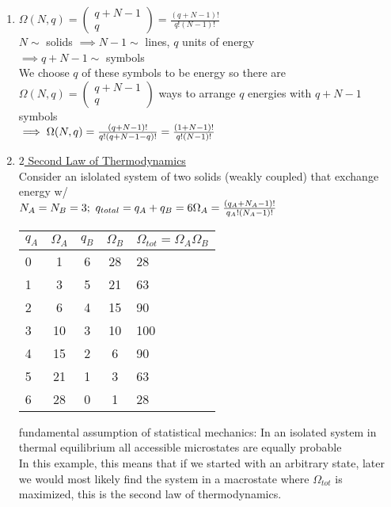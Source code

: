 \documentclass[12pt]{amsart}
\begin{document}
\begin{enumerate}
\item \underline{$\Omega(N,q) = \begin{pmatrix} q + N-1 \\ q \end{pmatrix} = \frac{( q+N-1)!}{q! (N-1) !}$}\\
$N \sim$ solids $\implies N-1 \sim$ lines, $q$ units of energy\\
$\implies q+ N -1 \sim$ symbols\\
We choose $q$ of these symbols to be energy so there are $\Omega(N, q) = \begin{pmatrix} q + N -1 \\ q \end{pmatrix}$ ways to arrange $q$ energies with $q + N-1$ symbols\\
$\implies \Omega(N,q) = \frac{(q + N -1)!}{q! (q+ N-1-q)!} = \frac{(1 + N -1 )!}{q! (N-1)!}\\$


\hdashrule[0.5ex][c]{\linewidth}{0.5pt}{1.5mm}


\item \underline{$2$ Second Law of Thermodynamics}\\
Consider an islolated system of two solids (weakly coupled) that exchange energy w/ \\
$N_A = N_B = 3;\,\, q_{total} = q_A + q_B = 6\\
\Omega_A = \frac{(q_A + N_A -1)!}{q_A! (N_A -1)!}\\$

\begin{table}[h!]
  \begin{center}
    \label{tab:table1}
    \begin{tabular}{l|c|c|c|l} %
      \textbf{$q_A$} & \textbf{$\Omega_A$} & \textbf{$q_B$} & \textbf{$\Omega_B$} & \textbf{$\Omega_{tot} = \Omega_A \Omega_B$}\\
      \hline
      0 & 1 & 6 & 28 & 28\\
      1 & 3 & 5 & 21 & 63\\
      2 & 6 & 4 & 15 & 90\\
      3 & 10 & 3 & 10 & 100\\
      4 & 15 & 2 & 6 & 90\\
      5 & 21 & 1 & 3 & 63\\
      6 & 28 & 0 & 1 & 28
    \end{tabular}
  \end{center}
\end{table}
fundamental assumption of statistical mechanics: In an isolated system in thermal equilibrium all accessible microstates are equally probable\\
In this example, this means that if we started with an arbitrary state, later we would most likely find the system in a macrostate where $\Omega_{tot}$ is maximized, this is the second law of thermodynamics.




\end{enumerate}
\end{document}
